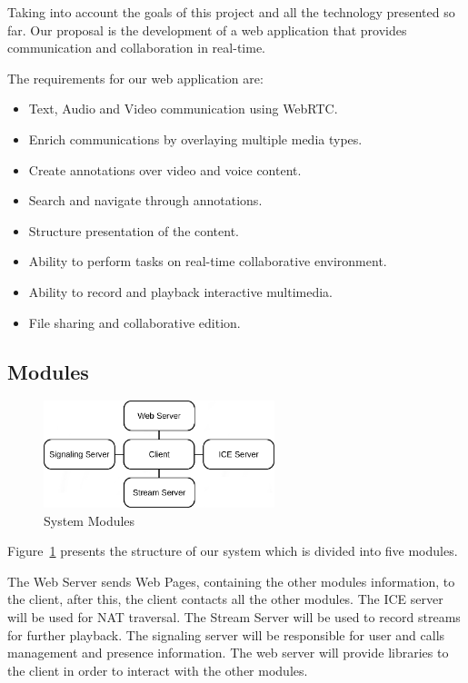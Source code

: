 Taking into account the goals of this project and all the technology presented so far. Our proposal is the development of a web application that provides communication and collaboration in real-time.

The requirements for our web application are:

\begin{itemize}
 \item Text, Audio and Video communication using \ac{WebRTC}.
 \item Enrich communications by overlaying multiple media types.
 \item Create annotations over video and voice content.
 \item Search and navigate through annotations.
 \item Structure presentation of the content.
 \item Ability to perform tasks on real-time collaborative environment.
 \item Ability to record and playback interactive multimedia.
 \item File sharing and collaborative edition.
\end{itemize}

\subsection{Modules}

\begin{figure}[H]
	\centering
	\includegraphics[width=0.6\textwidth]{figures/archs.png}
	\caption{System Modules}
        \label{fig:modules}
\end{figure}
Figure~\ref{fig:modules} presents the structure of our system which is divided into five modules. 

 The Web Server sends Web Pages, containing the other modules information, to the client, after this, the client contacts all the other modules. The \ac{ICE} server will be used for \ac{NAT} traversal. The Stream Server will be used to record streams for further playback. The signaling server will be responsible for user and calls management and presence information. The web server will provide libraries to the client in order to interact with the other modules.

